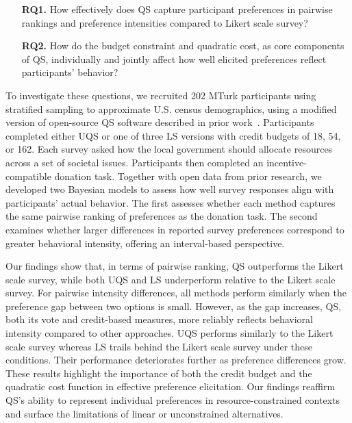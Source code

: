\begin{itemize}
    \item [\textbf{RQ1.}] How effectively does QS capture participant preferences in pairwise rankings and preference intensities compared to Likert scale survey?
    \item [\textbf{RQ2.}] How do the budget constraint and quadratic cost, as core components of QS, individually and jointly affect how well elicited preferences reflect participants' behavior?
\end{itemize}


To investigate these questions, we recruited 202 MTurk participants using stratified sampling to approximate U.S. census demographics, using a modified version of open-source QS software described in prior work~\cite{chengCanShowWhat2021}. Participants completed either UQS or one of three LS versions with credit budgets of 18, 54, or 162. Each survey asked how the local government should allocate resources across a set of societal issues. Participants then completed an incentive-compatible donation task. Together with open data from prior research, we developed two Bayesian models to assess how well survey responses align with participants' actual behavior. The first assesses whether each method captures the same pairwise ranking of preferences as the donation task. The second examines whether larger differences in reported survey preferences correspond to greater behavioral intensity, offering an interval-based perspective.

Our findings show that, in terms of pairwise ranking, QS outperforms the Likert scale survey, while both UQS and LS underperform relative to the Likert scale survey. For pairwise intensity differences, all methods perform similarly when the preference gap between two options is small. However, as the gap increases, QS, both its vote and credit-based measures, more reliably reflects behavioral intensity compared to other approaches. UQS performs similarly to the Likert scale survey whereas LS trails behind the Likert scale survey under these conditions. Their performance deteriorates further as preference differences grow. These results highlight the importance of both the credit budget and the quadratic cost function in effective preference elicitation. Our findings reaffirm QS's ability to represent individual preferences in resource-constrained contexts and surface the limitations of linear or unconstrained alternatives.


